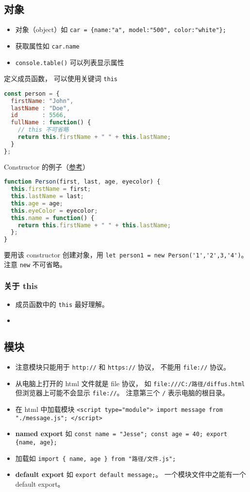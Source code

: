 \subsection{对象}
\begin{itemize}
\item 对象（object）如 \verb|car = {name:"a", model:"500", color:"white"};|
\item 获取属性如 \verb|car.name|
\item \verb|console.table()| 可以列表显示属性
\end{itemize}

定义成员函数， 可以使用关键词 \verb|this|
\begin{lstlisting}[language=js]
const person = {
  firstName: "John",
  lastName : "Doe",
  id       : 5566,
  fullName : function() {
    // this 不可省略
    return this.firstName + " " + this.lastName;
  }
};
\end{lstlisting}

Constructor 的例子（\href{https://www.w3schools.com/js/js_object_constructors.asp}{参考}）
\begin{lstlisting}[language=js]
function Person(first, last, age, eyecolor) {
  this.firstName = first;
  this.lastName = last;
  this.age = age;
  this.eyeColor = eyecolor;
  this.name = function() {
    return this.firstName + " " + this.lastName;
  };
}
\end{lstlisting}
要用该 constructor 创建对象，用 \verb`let person1 = new Person('1','2',3,'4')`。 注意 \verb`new` 不可省略。

\subsubsection{关于 this}
\begin{itemize}
\item 成员函数中的 \verb`this` 最好理解。
\item 
\end{itemize}


\subsection{模块}
\begin{itemize}
\item 注意模块只能用于 \verb|http://| 和 \verb|https://| 协议， 不能用 \verb|file://| 协议。
\item 从电脑上打开的 html 文件就是 file 协议， 如 \verb|file:///C:/路径/diffus.html| 但浏览器上可能不会显示 \verb|file://|。 注意第三个 \verb|/| 表示电脑的根目录。
\item 在 html 中加载模块 \verb|<script type="module"> import message from "./message.js"; </script>|
\item \textbf{named export} 如 \verb|const name = "Jesse"; const age = 40; export {name, age};|
\item 加载如 \verb|import { name, age } from "路径/文件.js";|
\item \textbf{default export} 如 \verb|export default message;|。 一个模块文件中之能有一个 default export。
\end{itemize}

